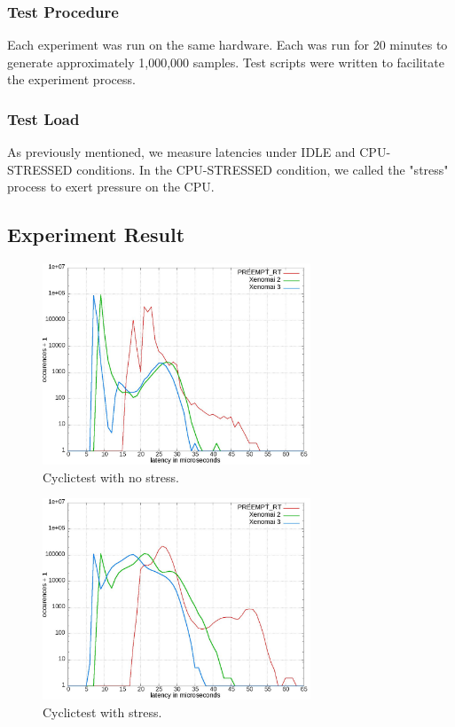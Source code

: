 \documentclass[10pt,a4paper]{article}
\begin{document}
\begin{multicols}{2}
\subsubsection{Test Procedure}
Each experiment was run on the same hardware. Each was run for 20 minutes to generate approximately 1,000,000 samples. Test scripts were written to facilitate the experiment process.
\subsubsection{Test Load}
As previously mentioned, we measure latencies under IDLE and CPU-STRESSED conditions. In the CPU-STRESSED condition, we called the "stress" process to exert pressure on the CPU.
\subsection{Experiment Result}
\begin{figure}[H]
\begin{center}
\includegraphics[width=8cm]{img/cyclictest_idle.jpg}
\caption{Cyclictest with no stress.}
\label{cyclictest-idle}
\end{center}
\end{figure}

\begin{figure}[H]
\begin{center}
\includegraphics[width=8cm]{img/cyclictest_stress.jpg}
\caption{Cyclictest with stress.}
\label{cyclictest-tress}
\end{center}
\end{figure}


\end{multicols}
\end{document}
